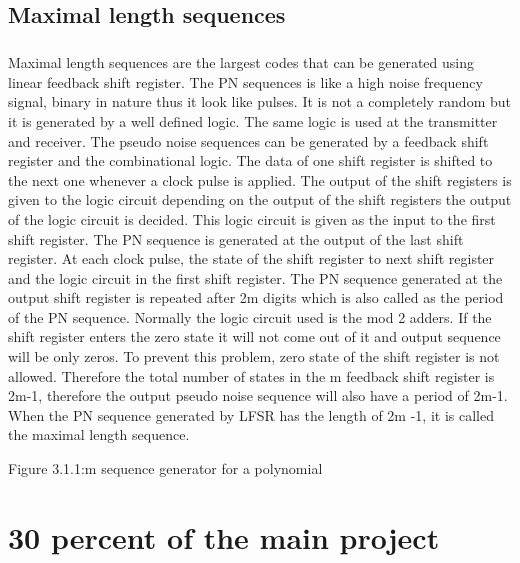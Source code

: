 \documentclass[a4paper]{report}
\begin{document}
\section{Maximal length sequences}
\paragraph{}
\large\textnormal{Maximal length sequences are the largest codes that can be generated using linear feedback shift register. The PN sequences is like a high noise frequency signal, binary in nature thus it look like pulses. It is not a completely random but it is generated by a well defined logic. The same logic is used at the transmitter and receiver. The pseudo noise sequences can be generated by a feedback shift register and the combinational logic. The data of one shift register is shifted to the next one whenever a clock pulse is applied. The output of the shift registers is given to the logic circuit depending on the output of the shift registers the output of the logic circuit  is decided. This logic circuit is given as the input to the first shift register. The PN sequence is generated at the output of the last shift register. At each clock pulse, the state of the shift register to next shift register and the logic circuit in the first shift register. The PN sequence generated at the output shift register is repeated after 2m   digits which is also called as the period of the PN sequence. Normally the logic circuit used is the mod 2 adders. If the shift register enters the zero state it will not come out of it and output sequence will be only zeros. To prevent this problem, zero state of the shift register is not allowed. Therefore the total number of states in the m feedback shift register is 2m-1, therefore the output pseudo noise sequence will also have a period of 2m-1.   When the PN sequence generated by LFSR has the length of 2m -1, it is called the maximal length sequence.}
\begin{center}

\end{center}
\begin{center}
\small\textnormal{Figure 3.1.1:m sequence generator for a polynomial}
\end{center}
\chapter{30 percent of the main project}
\end{document}
